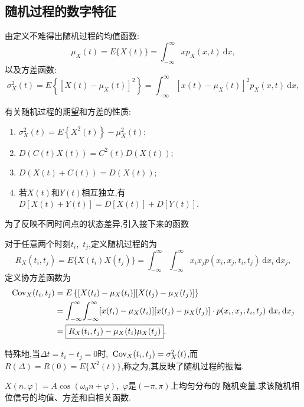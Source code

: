 \documentclass[cn,10pt,citestyle=gb7714-2015,bibstyle=gb7714-2015]{elegantbook}
\newcommand{\md}{\ \mathrm{d}}
\newcommand{\Cov}{\textup{Cov}}
\begin{document}
\subsection{随机过程的数字特征}
由定义不难得出随机过程的均值函数:
\begin{equation}
  \mu_X(t)=E\{X(t)\}=\int_{-\infty}^\infty xp_X(x,t)\md x,
\end{equation}
以及方差函数:
\begin{equation}
  \sigma_X^2(t)=E\left\{[X(t)-\mu_X(t)]^2\right\}=\int_{-\infty}^\infty\left[x(t)-\mu_X(t)\right]^2p_X(x,t)\md x,
\end{equation}
\begin{property}
  有关随机过程的期望和方差的性质:
  \begin{enumerate}
    \item $\sigma_X^2(t)=E\left\{X^2(t)\right\}-\mu_X^2(t)$;
    \item $D(C(t)X(t))=C^2(t)D(X(t))$;
    \item $D(X(t)+C(t))=D(X(t))$;
    \item 若$X(t)$和$Y(t)$相互独立,有$D[X(t)+Y(t)]=D[X(t)]+D[Y(t)]$.
  \end{enumerate}
\end{property}
为了反映不同时间点的状态差异,引入接下来的函数
\begin{definition}[相关函数和协方差函数]\label{def:rela-cov}
  对于任意两个时刻$t_i$,\ $t_j$,定义随机过程的为
  \begin{equation}\label{eq:relative}
    R_X(t_i,t_j)=E\{X(t_i)X(t_j)\}=\int_{-\infty}^\infty\!\int_{-\infty}^\infty x_ix_jp(x_i,x_j,t_i,t_j)\md x_i\!\md x_j,
  \end{equation}
  定义协方差函数为
    \begin{align}
      \Cov_X(t_i,t_j)&=E\left\{[X(t_i)-\mu_X(t_i)][X(t_j)-\mu_X(t_j)]\right\}\label{eq:Cov1}\\
      &=\int_{-\infty}^\infty\!\int_{-\infty}^\infty[x(t_i)-\mu_X(t_i)][x(t_j)-\mu_X(t_j)]\cdot p(x_i,x_j,t_i,t_j)\md x_i\!\md x_j\label{eq:Cov2}\\
      &=\boxed{R_X(t_i,t_j)-\mu_X(t_i)\mu_X(t_j)}.\label{eq:Cov3}
    \end{align}
\end{definition}
特殊地,当$\Delta t=t_i-t_j=0$时,\ $\Cov_X(t_i,t_j)=\sigma_X^2(t)$,而
$R(\Delta)=R(0)=E\{X^2(t)\}$,称之为,其反映了随机过程的振幅.
\begin{example}
  $X(n,\varphi)=A\cos(\omega_0n+\varphi)$,\ $\varphi$是$(-\pi,\pi)$上均匀分布的
  随机变量.求该随机相位信号的均值、方差和自相关函数.
\end{example}
\end{document}
